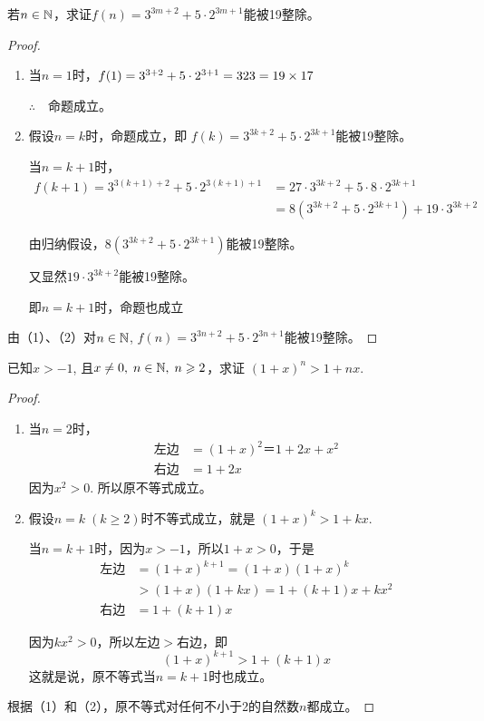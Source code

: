 \begin{example}
    若$n\in\mathbb{N}$，求证$f(n)=3^{3m+2}+5\cdot 2^{3m+1}$能被19整除。
\end{example}

\begin{proof}
\begin{enumerate}[(1)]
    \item 
当$n=1$时，$f(1)=3^{3+2}+5\cdot 2^{3+1}=323=19\times17$

$\therefore\quad $命题成立。
\item 假设$n=k$时，命题成立，即
$f(k)=3^{3k+2}+5\cdot 2^{3k+1}$能被19整除。

当$n=k+1$时，
\[\begin{split}
f(k+1)=3^{3(k+1)+2}+5\cdot 2^{3(k+1)+1}&=27\cdot 3^{3k+2}+5\cdot 8\cdot 2^{3k+1}\\
&=8(3^{3k+2}+5\cdot 2^{3k+1})+19\cdot 3^{3k+2}    
\end{split}\]

由归纳假设，$8(3^{3k+2}+5\cdot 2^{3k+1})$能被19整除。

又显然$19\cdot 3^{3k+2}$能被19整除。

即$n=k+1$时，命题也成立
\end{enumerate} 

由（1）、（2）对$n\in\mathbb{N}$, $f(n)=3^{3n+2}+5\cdot 2^{3n+1}$能被19整除。
\end{proof}



\begin{example}
    已知$x>-1$, 且$x\ne 0,\; n\in\mathbb{N},\; n\geqslant 2$，求证
$(1+x)^n>1+nx$.
\end{example}

\begin{proof}
\begin{enumerate}[(1)]
    \item  当$n=2$时，
\[\begin{split}
\text{左边}&=(1+x)^2＝1+2x+x^2\\
\text{右边}&=1+2x    
\end{split}\]
因为$x^2>0$. 所以原不等式成立。
\item 假设$n=k\; (k\ge 2)$时不等式成立，就是
$(1+x)^k>1+kx$.

当$n=k+1$时，因为$x>-1$，所以$1+x>0$，于是
\[\begin{split}
\text{左边}&=(1+x)^{k+1}=(1+x)(1+x)^k\\
&>(1+x)(1+kx)=1+(k+1)x+kx^2\\
\text{右边}&=1+(k+1)x    
\end{split}\]

因为$kx^2>0$，所以左边$>$右边，即
\[(1+x)^{k+1}>1+(k+1)x\]
这就是说，原不等式当$n=k+1$时也成立。
\end{enumerate}

根据（1）和（2），原不等式对任何不小于2的自然数$n$都成立。
\end{proof}




